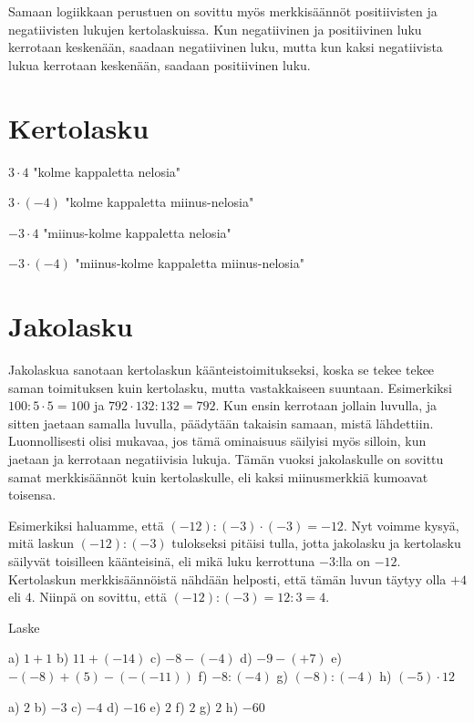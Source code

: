
Samaan logiikkaan perustuen on sovittu myös merkkisäännöt positiivisten ja negatiivisten lukujen kertolaskuissa. Kun negatiivinen ja positiivinen luku kerrotaan keskenään, saadaan negatiivinen luku, mutta kun kaksi negatiivista lukua kerrotaan keskenään, saadaan positiivinen luku.

\section{Kertolasku}

$3 \cdot 4$ "kolme kappaletta nelosia"


$3 \cdot (-4)$ "kolme kappaletta miinus-nelosia"


$-3 \cdot 4$ "miinus-kolme kappaletta nelosia"


$-3 \cdot (-4)$ "miinus-kolme kappaletta miinus-nelosia"


\section{Jakolasku}

Jakolaskua sanotaan kertolaskun käänteistoimitukseksi, koska se tekee tekee saman toimituksen kuin kertolasku, mutta vastakkaiseen suuntaan. Esimerkiksi $100:5\cdot 5=100$ ja $792\cdot 132:132=792$. Kun ensin kerrotaan jollain luvulla, ja sitten jaetaan samalla luvulla, päädytään takaisin samaan, mistä lähdettiin. Luonnollisesti olisi mukavaa, jos tämä ominaisuus säilyisi myös silloin, kun jaetaan ja kerrotaan negatiivisia lukuja. Tämän vuoksi jakolaskulle on sovittu samat merkkisäännöt kuin kertolaskulle, eli kaksi miinusmerkkiä kumoavat toisensa.

Esimerkiksi haluamme, että $(-12):(-3)\cdot (-3)=-12$. Nyt voimme kysyä, mitä laskun $(-12):(-3)$ tulokseksi pitäisi tulla, jotta jakolasku ja kertolasku säilyvät toisilleen käänteisinä, eli mikä luku kerrottuna $-3$:lla on $-12$. Kertolaskun merkkisäännöistä nähdään helposti, että tämän luvun täytyy olla $+4$ eli $4$. Niinpä on sovittu, että $(-12):(-3)=12:3=4$.

Laske

\begin{tehtava}
    a) $1+1$
    b) $11+(-14)$
    c) $-8-(-4)$
    d) $-9-(+7)$
    e) $-(-8)+(5)-(-(-11))$
    f) $-8:(-4)$
    g) $(-8):(-4)$
    h) $(-5)\cdot 12$


    \begin{vastaus}
        a) $2$
        b) $-3$
        c) $-4$
        d) $-16$
        e) $2$
        f) $2$
        g) $2$
        h) $-60$
    \end{vastaus}
\end{tehtava}

